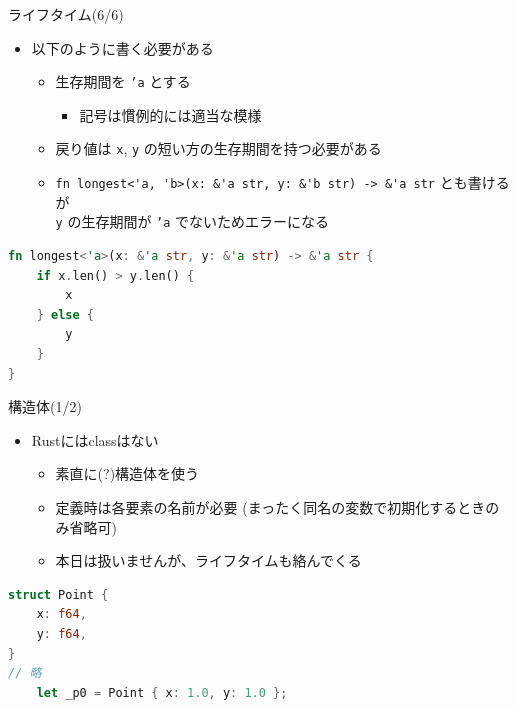 \documentclass[cjk,dvipdfmx,10pt,compress,fragile%
hyperref={bookmarks=true,bookmarksnumbered=true,bookmarksopen=false,%
colorlinks=false,%
pdftitle={第 134 回 関西 Debian 勉強会},%
pdfauthor={小林},%
pdfsubject={資料},%
}]{beamer}
\begin{document}
\begin{frame}[t,fragile]{ライフタイム(6/6)}
\begin{itemize}
 \item 以下のように書く必要がある
       \begin{itemize}
	\item 生存期間を \texttt{'a} とする
	      \begin{itemize}
	       \item 記号は慣例的には適当な模様
	      \end{itemize}
	\item 戻り値は \texttt{x}, \texttt{y} の短い方の生存期間を持つ必要がある
	\item \verb|fn longest<'a, 'b>(x: &'a str, y: &'b str) -> &'a str| とも書けるが\\
	      \texttt{y} の生存期間が \texttt{'a} でないためエラーになる
       \end{itemize}
\end{itemize}
\begin{lstlisting}[language=Rust,style=boxed,style=colouredRust,basicstyle=\small\tt,lineskip=-2pt]
fn longest<'a>(x: &'a str, y: &'a str) -> &'a str {
    if x.len() > y.len() {
        x
    } else {
        y
    }
}\end{lstlisting}
\end{frame}

\begin{frame}[t,fragile]{構造体(1/2)}
\begin{itemize}
 \item Rustにはclassはない
       \begin{itemize}
	\item 素直に(?)構造体を使う
	\item 定義時は各要素の名前が必要 (まったく同名の変数で初期化するときのみ省略可)
	\item 本日は扱いませんが、ライフタイムも絡んでくる
       \end{itemize}
\end{itemize}
\begin{lstlisting}[language=Rust,style=boxed,style=colouredRust,basicstyle=\small\tt,lineskip=-2pt]
struct Point {
    x: f64,
    y: f64,
}
// 略
    let _p0 = Point { x: 1.0, y: 1.0 };
\end{lstlisting}
\end{frame}
\end{document}
